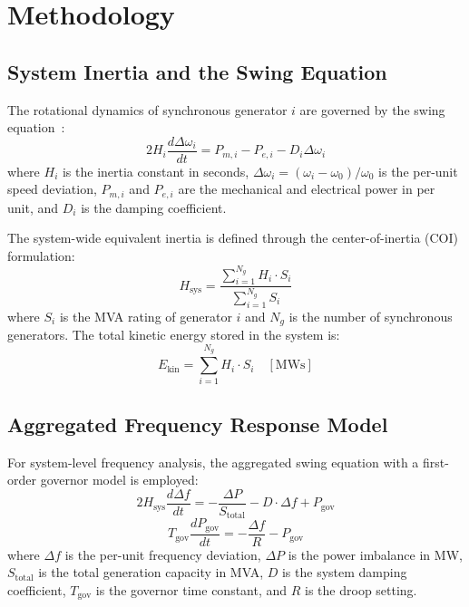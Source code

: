 \documentclass[]{ieeeaccess}
\begin{document}
\section{Methodology}
\label{sec:methodology}

\subsection{System Inertia and the Swing Equation}

The rotational dynamics of synchronous generator $i$ are governed by the swing equation~\cite{kundur1994}:
\begin{equation}
    2 H_i \frac{d\Delta\omega_i}{dt} = P_{m,i} - P_{e,i} - D_i \Delta\omega_i
    \label{eq:swing}
\end{equation}
where $H_i$ is the inertia constant in seconds, $\Delta\omega_i = (\omega_i - \omega_0)/\omega_0$ is the per-unit speed deviation, $P_{m,i}$ and $P_{e,i}$ are the mechanical and electrical power in per unit, and $D_i$ is the damping coefficient.

The system-wide equivalent inertia is defined through the center-of-inertia (COI) formulation:
\begin{equation}
    H_{\mathrm{sys}} = \frac{\displaystyle\sum_{i=1}^{N_g} H_i \cdot S_i}{\displaystyle\sum_{i=1}^{N_g} S_i}
    \label{eq:hsys}
\end{equation}
where $S_i$ is the MVA rating of generator $i$ and $N_g$ is the number of synchronous generators. The total kinetic energy stored in the system is:
\begin{equation}
    E_{\mathrm{kin}} = \sum_{i=1}^{N_g} H_i \cdot S_i \quad [\mathrm{MWs}]
    \label{eq:ekin}
\end{equation}

\subsection{Aggregated Frequency Response Model}

For system-level frequency analysis, the aggregated swing equation with a first-order governor model is employed:
\begin{equation}
    2 H_{\mathrm{sys}} \frac{d\Delta f}{dt} = -\frac{\Delta P}{S_{\mathrm{total}}} - D \cdot \Delta f + P_{\mathrm{gov}}
    \label{eq:agg_swing}
\end{equation}
\begin{equation}
    T_{\mathrm{gov}} \frac{dP_{\mathrm{gov}}}{dt} = -\frac{\Delta f}{R} - P_{\mathrm{gov}}
    \label{eq:governor}
\end{equation}
where $\Delta f$ is the per-unit frequency deviation, $\Delta P$ is the power imbalance in MW, $S_{\mathrm{total}}$ is the total generation capacity in MVA, $D$ is the system damping coefficient, $T_{\mathrm{gov}}$ is the governor time constant, and $R$ is the droop setting.
\end{document}
